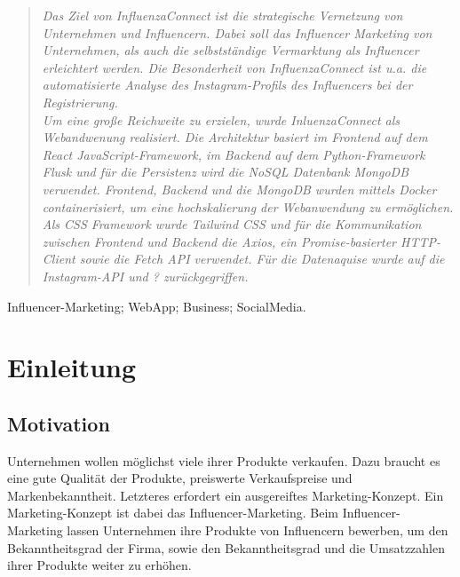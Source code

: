 \documentclass[conference,a4paper,flushend]{cs-techrep}
\begin{document}
\selectlanguage{\cstechrepLang}

\maketitle

\begin{abstract}
\textit{Das Ziel von InfluenzaConnect ist die strategische Vernetzung von Unternehmen und Influencern. Dabei soll das Influencer Marketing von Unternehmen, als auch die selbstständige Vermarktung als Influencer erleichtert werden. Die Besonderheit von InfluenzaConnect ist u.a. die automatisierte Analyse des Instagram-Profils des Influencers bei der Registrierung.\\
Um eine große Reichweite zu erzielen, wurde InluenzaConnect als Webandwenung realisiert. Die Architektur basiert im Frontend auf dem React JavaScript-Framework, im Backend auf dem Python-Framework Flusk und für die Persistenz wird die NoSQL Datenbank MongoDB verwendet. 
Frontend, Backend und die MongoDB wurden mittels Docker containerisiert, um eine hochskalierung der Webanwendung zu ermöglichen.
Als CSS Framework wurde Tailwind CSS und für die Kommunikation zwischen Frontend und Backend die Axios, ein Promise-basierter HTTP-Client sowie die Fetch API verwendet. Für die Datenaquise wurde auf die Instagram-API und ? zurückgegriffen.}
\end{abstract}

\begin{IEEEkeywords}
Influencer-Marketing; WebApp; Business; SocialMedia.
\end{IEEEkeywords}




\section{Einleitung}
\subsection{Motivation}
Unternehmen wollen möglichst viele ihrer Produkte verkaufen. Dazu braucht es eine gute Qualität der Produkte, preiswerte Verkaufspreise und Markenbekanntheit. Letzteres erfordert ein ausgereiftes Marketing-Konzept.
Ein Marketing-Konzept ist dabei das Influencer-Marketing. Beim Influencer-Marketing lassen Unternehmen ihre Produkte von Influencern bewerben, um den Bekanntheitsgrad der Firma, sowie den Bekanntheitsgrad und die Umsatzzahlen ihrer Produkte weiter zu erhöhen. 
\end{document}
